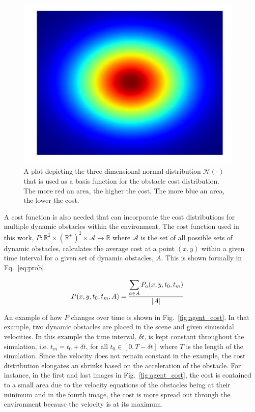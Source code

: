 \documentclass[letterpaper, 10pt, conference]{ieeeconf}
\begin{document}
\begin{figure}[h!]
    \centering
    \includegraphics[width=0.60\linewidth]{figs/normal_3d}

    \caption{A plot depicting the three dimensional normal distribution
    $\mathcal{N}(\cdot)$ that is used as a basis function for the obstacle cost
distribution. The more red an area, the higher the cost. The more blue an area,
the lower the cost.}

    \label{fig:normal_3d}
\end{figure}

A cost function is also needed that can incorporate the cost distributions for
multiple dynamic obstacles within the environment. The cost function used in
this work, $P: \mathbb{R}^2 \times (\mathbb{R}^+)^2 \times \mathcal{A}
\rightarrow \mathbb{R}$ where $\mathcal{A}$ is the set of all possible sets of
dynamic obstacles, calculates the average cost at a point $(x, y)$ within a
given time interval for a given set of dynamic obstacles, $A$. This is shown
formally in Eq.~\ref{eq:prob}.


\begin{equation}
    P(x, y, t_0, t_m, A) = \frac{\mathlarger{\sum_{a \in A} P_a(x, y, t_0,
    t_m)}}{|A|}
    \label{eq:prob}
\end{equation}

An example of how $P$ changes over time is shown in Fig.~\ref{fig:agent_cost}.
In that example, two dynamic obstacles are placed in the scene and given
sinusoidal velocities. In this example the time interval, $\delta t$, is kept
constant throughout the simulation, i.e. $t_m = t_0 + \delta t$, for all $t_0
\in [0, T - \delta t]$ where $T$ is the length of the simulation. Since the
velocity does not remain constant in the example, the cost distribution
elongates an shrinks based on the acceleration of the obstacle. For instance,
in the first and last images in Fig.~\ref{fig:agent_cost}, the cost is
contained to a small area due to the velocity equations of the obstacles being
at their minimum and in the fourth image, the cost is more spread out through
the environment because the velocity is at its maximum.
\end{document}
